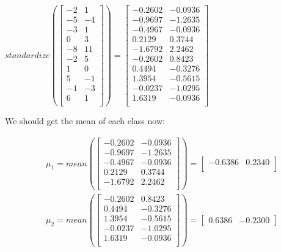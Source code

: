 \documentclass[12pt]{article}
\begin{document}
\begin{center}
$
standardize(
\begin{bmatrix}
-2 & 1\\
-5 & -4\\
-3 & 1\\
0 & 3\\
-8 & 11\\
-2 & 5\\
1 & 0\\
5 & -1\\
-1 & -3\\
6 & 1\\
\end{bmatrix}
)=\begin{bmatrix}
-0.2602 & -0.0936\\
-0.9697 & -1.2635\\
-0.4967 & -0.0936\\
0.2129 & 0.3744\\
-1.6792 & 2.2462\\
-0.2602 & 0.8423\\
0.4494 & -0.3276\\
1.3954 & -0.5615\\
-0.0237 & -1.0295\\
1.6319 & -0.0936\\
\end{bmatrix}
$
\\[0.1 in]
\end{center}
We should get the mean of each class now:
\begin{center}
\begin{align}
&\mu_{1} = mean\left(\begin{bmatrix}
-0.2602 & -0.0936\\
-0.9697 & -1.2635\\
-0.4967 & -0.0936\\
0.2129 & 0.3744\\
-1.6792 & 2.2462\\
\end{bmatrix}\right)
=
\begin{bmatrix}
-0.6386 & 0.2340\\
\end{bmatrix} \label{mean1} \\
&\mu_{2} = mean\left(\begin{bmatrix}
-0.2602 & 0.8423\\
0.4494 & -0.3276\\
1.3954 & -0.5615\\
-0.0237 & -1.0295\\
1.6319 & -0.0936\\
\end{bmatrix}\right)
=
\begin{bmatrix}
0.6386 & -0.2300
\end{bmatrix}\label{mean2}
\end{align}
\end{center}
\end{document}
